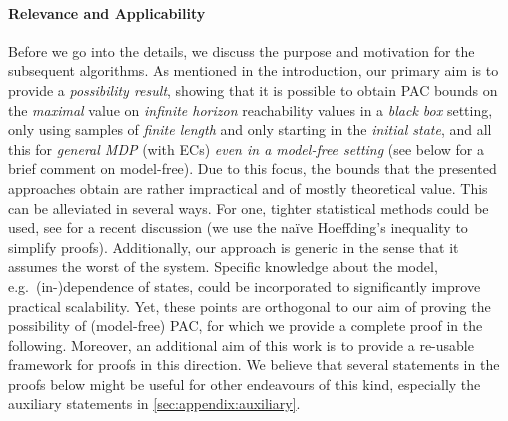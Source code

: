 \documentclass{theoretics}
\begin{document}
\paragraph{Relevance and Applicability}
Before we go into the details, we discuss the purpose and motivation for the subsequent algorithms.
As mentioned in the introduction, our primary aim is to provide a \emph{possibility result}, showing that it is possible to obtain PAC bounds on the \emph{maximal} value on \emph{infinite horizon} reachability values in a \emph{black box} setting, only using samples of \emph{finite length} and only starting in the \emph{initial state}, and all this for \emph{general MDP} (with ECs) \emph{even in a model-free setting} (see below for a brief comment on model-free).
Due to this focus, the bounds that the presented approaches obtain are rather impractical and of mostly theoretical value.
This can be alleviated in several ways.
For one, tighter statistical methods could be used, see \cite{DBLP:journals/corr/abs-2404-05424} for a recent discussion (we use the na\"ive Hoeffding's inequality to simplify proofs).
Additionally, our approach is generic in the sense that it assumes the worst of the system.
Specific knowledge about the model, e.g.\ (in-)dependence of states, could be incorporated to significantly improve practical scalability.
Yet, these points are orthogonal to our aim of proving the possibility of (model-free) PAC, for which we provide a complete proof in the following.
Moreover, an additional aim of this work is to provide a re-usable framework for proofs in this direction.
We believe that several statements in the proofs below might be useful for other endeavours of this kind, especially the auxiliary statements in \cref{sec:appendix:auxiliary}.
\end{document}
